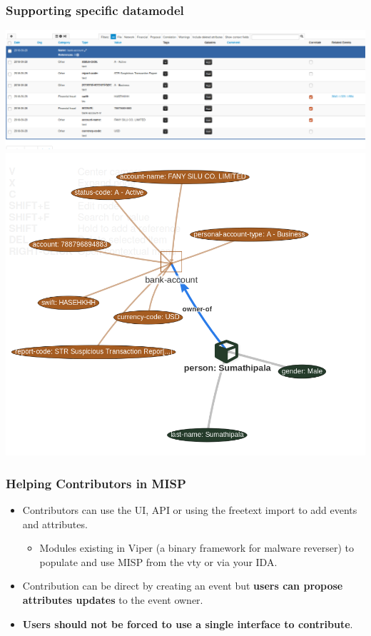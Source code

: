 \begin{frame}
        \frametitle{Supporting specific datamodel}
        \includegraphics[scale=0.24]{screenshots/bankaccount.png}
        \includegraphics[scale=0.18]{screenshots/bankview.png}
\end{frame}

\begin{frame}
        \frametitle{Helping Contributors in MISP}
        \begin{itemize}
            \item Contributors can use the UI, API or using the freetext import to add events and attributes.
                \begin{itemize}
                        \item Modules existing in Viper (a binary framework for malware reverser) to populate and use MISP from the vty or via your IDA.
                \end{itemize}
        \item Contribution can be direct by creating an event but {\bf users can propose attributes updates} to the event owner.
            \item {\bf Users should not be forced to use a single interface to contribute}.
        \end{itemize}
\end{frame}

